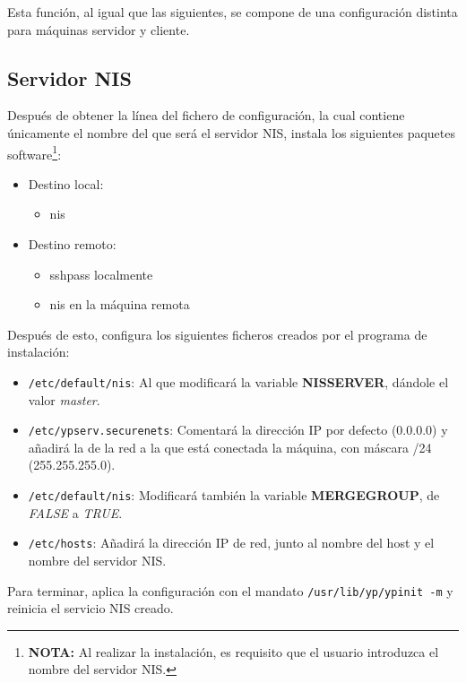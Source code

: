 Esta función, al igual que las siguientes, se compone de una configuración distinta para máquinas servidor y cliente.

\subsection{Servidor NIS}
Después de obtener la línea del fichero de configuración, la cual contiene únicamente el nombre del que será el servidor NIS, instala los siguientes paquetes software\footnote{\textbf{NOTA:} Al realizar la instalación, es requisito que el usuario introduzca el nombre del servidor NIS.}:
\begin{itemize}
    \item Destino local:
    \begin{itemize}
        \item nis
    \end{itemize}
    \item Destino remoto:
    \begin{itemize}
        \item sshpass localmente
        \item nis en la máquina remota
    \end{itemize}
\end{itemize}

Después de esto, configura los siguientes ficheros creados por el programa de instalación\cite{nisserver}:
\begin{itemize}
    \item \texttt{/etc/default/nis}: Al que modificará la variable \textbf{NISSERVER}, dándole el valor \textit{master}.
    \item \texttt{/etc/ypserv.securenets}: Comentará la dirección IP por defecto (0.0.0.0) y añadirá la de la red a la que está conectada la máquina, con máscara /24 (255.255.255.0).
    \item \texttt{/etc/default/nis}: Modificará también la variable \textbf{MERGEGROUP}, de \textit{FALSE} a \textit{TRUE}.
    \item \texttt{/etc/hosts}: Añadirá la dirección IP de red, junto al nombre del host y el nombre del servidor NIS.
\end{itemize}

Para terminar, aplica la configuración con el mandato \texttt{/usr/lib/yp/ypinit -m} y reinicia el servicio NIS creado.

